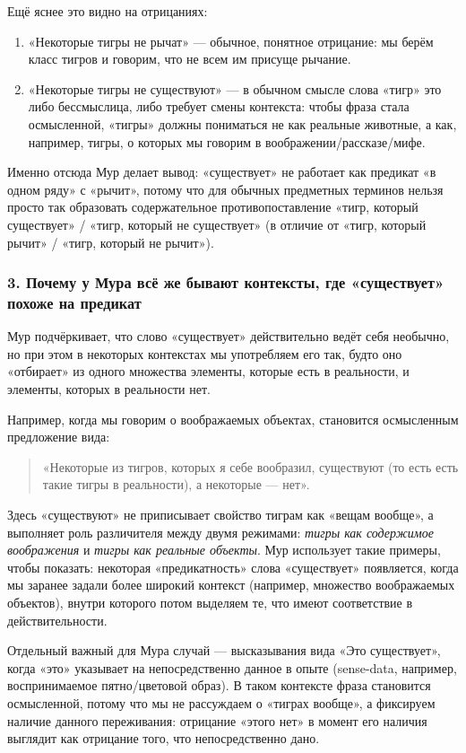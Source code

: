 \documentclass[a4paper,12pt]{article}
\begin{document}
Ещё яснее это видно на отрицаниях:
\begin{enumerate}
    \item «Некоторые тигры не рычат» — обычное, понятное отрицание: мы берём класс тигров и говорим, что не всем им присуще рычание.
    \item «Некоторые тигры не существуют» — в обычном смысле слова «тигр» это либо бессмыслица, либо требует смены контекста: чтобы фраза стала осмысленной, «тигры» должны пониматься не как реальные животные, а как, например, тигры, о которых мы говорим в воображении/рассказе/мифе.
\end{enumerate}

Именно отсюда Мур делает вывод: «существует» не работает как предикат «в одном ряду» с «рычит», потому что для обычных предметных терминов нельзя просто так образовать содержательное противопоставление «тигр, который существует» / «тигр, который не существует» (в отличие от «тигр, который рычит» / «тигр, который не рычит»).

\subsubsection*{3. Почему у Мура всё же бывают контексты, где «существует» похоже на предикат}

Мур подчёркивает, что слово «существует» действительно ведёт себя необычно, но при этом в некоторых контекстах мы употребляем его так, будто оно «отбирает» из одного множества элементы, которые есть в реальности, и элементы, которых в реальности нет.

Например, когда мы говорим о воображаемых объектах, становится осмысленным предложение вида:
\begin{quote}
«Некоторые из тигров, которых я себе вообразил, существуют (то есть есть такие тигры в реальности), а некоторые — нет».
\end{quote}
Здесь «существуют» не приписывает свойство тиграм как «вещам вообще», а выполняет роль различителя между двумя режимами: \emph{тигры как содержимое воображения} и \emph{тигры как реальные объекты}. Мур использует такие примеры, чтобы показать: некоторая «предикатность» слова «существует» появляется, когда мы заранее задали более широкий контекст (например, множество воображаемых объектов), внутри которого потом выделяем те, что имеют соответствие в действительности.

Отдельный важный для Мура случай — высказывания вида «Это существует», когда «это» указывает на непосредственно данное в опыте (sense-data, например, воспринимаемое пятно/цветовой образ). В таком контексте фраза становится осмысленной, потому что мы не рассуждаем о «тиграх вообще», а фиксируем наличие данного переживания: отрицание «этого нет» в момент его наличия выглядит как отрицание того, что непосредственно дано.
\end{document}
